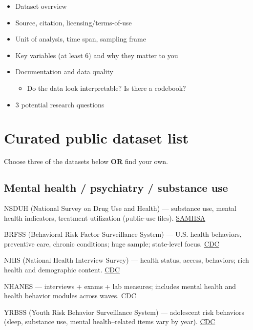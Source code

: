 \documentclass[
  11pt,
]{article}
\providecommand{\tightlist}{%
  \setlength{\itemsep}{0pt}\setlength{\parskip}{0pt}}
\begin{document}
\begin{itemize}
\tightlist
\item
  Dataset overview
\item
  Source, citation, licensing/terms-of-use
\item
  Unit of analysis, time span, sampling frame
\item
  Key variables (at least 6) and why they matter to you
\item
  Documentation and data quality

  \begin{itemize}
  \tightlist
  \item
    Do the data look interpretable? Is there a codebook?
  \end{itemize}
\item
  3 potential research questions
\end{itemize}

\section{Curated public dataset list}\label{curated-public-dataset-list}

Choose three of the datasets below \textbf{OR} find your own.

\subsection{Mental health / psychiatry / substance
use}\label{mental-health-psychiatry-substance-use}

NSDUH (National Survey on Drug Use and Health) --- substance use, mental
health indicators, treatment utilization (public-use files).
\href{https://www.samhsa.gov/data/data-we-collect/nsduh-national-survey-drug-use-and-health/datafiles}{SAMHSA}

BRFSS (Behavioral Risk Factor Surveillance System) --- U.S. health
behaviors, preventive care, chronic conditions; huge sample; state-level
focus. \href{https://www.cdc.gov/brfss/annual_data/annual_data.htm}{CDC}

NHIS (National Health Interview Survey) --- health status, access,
behaviors; rich health and demographic content.
\href{https://www.cdc.gov/nchs/nhis/documentation/index.html}{CDC}

NHANES --- interviews + exams + lab measures; includes mental health and
health behavior modules across waves.
\href{https://wwwn.cdc.gov/nchs/nhanes/Default.aspx}{CDC}

YRBSS (Youth Risk Behavior Surveillance System) --- adolescent risk
behaviors (sleep, substance use, mental health--related items vary by
year). \href{https://www.cdc.gov/yrbs/data/index.html}{CDC}
\end{document}
